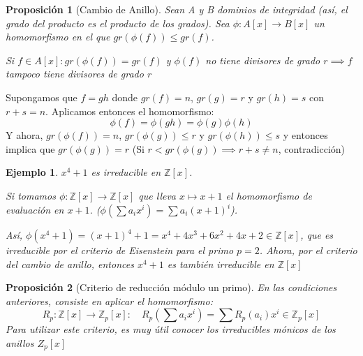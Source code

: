 \documentclass[11pt, a4paper, titlepage]{article}
\makeatletter
\newif\IfInSansMode
\let\oldsf\sffamily
\renewcommand*{\sffamily}{\oldsf\mathversion{sans}\InSansModetrue}
\let\oldnorm\normalfont
\renewcommand*{\normalfont}{\oldnorm\InSansModefalse\mathversion{normal}}
\renewenvironment{proof}[1][\proofname] {\vspace{-15pt}\par\pushQED{\qed}\normalfont\topsep6\p@\@plus6\p@\relax\trivlist\item[\hskip\labelsep\it#1\@addpunct{.}]\ignorespaces}{\popQED\endtrivlist\@endpefalse}
\providecommand{\ent}{\mathbb{Z}}
\renewenvironment{proof}[1][\proofname] {\par\pushQED{\qed}\normalfont\topsep6\p@\@plus6\p@\relax\trivlist\item[\hskip\labelsep\itshape\sffamily#1\@addpunct{.}]\ignorespaces}{\popQED\endtrivlist\@endpefalse}
\theoremstyle{theorem-style}
\newtheorem{nprop}{Proposición}[section]
\theoremstyle{definition-style}
\theoremstyle{remark-style}
\theoremstyle{example-style}
\newtheorem{ejemplo}{Ejemplo}[section]
\makeatother
\begin{document}
\begin{nprop}[Cambio de Anillo]
	Sean A y B dominios de integridad (así, el grado del producto es el producto de los grados). Sea $\phi : A[x] \to B[x]$ un homomorfismo en el que $gr(\phi(f))  \leq gr(f)$.

	Si $f\in A[x] : gr(\phi(f))= gr(f)$ y $\phi(f)$ no tiene divisores de grado $r \implies f$ tampoco tiene divisores de grado $r$
\end{nprop}
\begin{proof}
	Supongamos que $f=gh$ donde $gr(f) = n$, $gr(g) = r$ y $gr(h) = s$ con $r+s = n$.
	Aplicamos entonces el homomorfismo:
	\[
	\phi(f) = \phi(gh) = \phi(g)\phi(h)
	\]
	Y ahora, $gr(\phi(f)) = n$, $gr(\phi(g)) \leq r$ y $gr(\phi(h)) \leq s$ y entonces implica que $gr(\phi(g)) = r$ (Si $r < gr(\phi(g)) \implies r+s \neq n$, contradicción)
\end{proof}
\begin{ejemplo}
	$x^4+1$ es irreducible en $\ent[x]$.

	Si tomamos $\phi:\ent[x] \to \ent[x]$ que lleva $x \mapsto x+1$ el homomorfismo de evaluación en $x+1$. ($\phi(\sum a_i x^i) = \sum a_i (x+1)^i$).

	Así, $\phi(x^4+1) = (x+1)^4+1 = x^4 +4x^3 +6x^2 +4x + 2 \in \ent[x]$, que es irreducible por el criterio de Eisenstein para el primo $p=2$. Ahora, por el criterio del cambio de anillo, entonces $x^4+1$ es también irreducible en $\ent[x]$
\end{ejemplo}

\begin{nprop}[Criterio de reducción módulo un primo]
	En las condiciones anteriores, consiste en aplicar el homomorfismo:
	\[
	R_p:\ent[x] \to \ent_p[x] : \quad R_p(\sum a_i x^i) =  \sum R_p(a_i) x^i \in \ent_p[x]
	\]
	Para utilizar este criterio, es muy útil conocer los irreducibles mónicos de los anillos $Z_p[x]$
\end{nprop}
\end{document}
